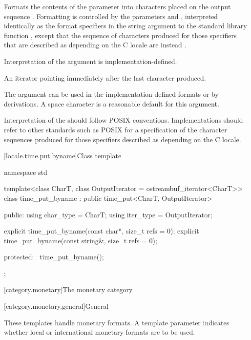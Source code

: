 \begin{itemdescr}
\pnum
\effects
Formats the contents of the parameter 
into characters placed on the output sequence .
Formatting is controlled by the parameters  and ,
interpreted identically as the format specifiers
in the string argument to the standard library function
%
,
except that the sequence of characters produced for those specifiers
that are described as depending on the C locale
are instead
.
\begin{note}
Interpretation of the  argument is implementation-defined.
\end{note}

\pnum
\returns
An iterator pointing immediately after the last character produced.
\begin{note}
The  argument can be used
in the implementation-defined formats or by derivations.
A space character is a reasonable default for this argument.
\end{note}

\pnum
\recommended
Interpretation of the  should follow POSIX conventions.
Implementations should refer to other standards such as POSIX
for a specification of the character sequences produced for
those specifiers described as depending on the C locale.
\end{itemdescr}

[locale.time.put.byname]{Class template }

%
\begin{codeblock}
namespace std {
  template<class CharT, class OutputIterator = ostreambuf_iterator<CharT>>
    class time_put_byname : public time_put<CharT, OutputIterator> {
    public:
      using char_type = CharT;
      using iter_type = OutputIterator;

      explicit time_put_byname(const char*, size_t refs = 0);
      explicit time_put_byname(const string&, size_t refs = 0);

    protected:
      ~time_put_byname();
    };
}
\end{codeblock}

[category.monetary]{The monetary category}

[category.monetary.general]{General}

\pnum
These templates handle monetary formats.
A template parameter indicates
whether local or international monetary formats are to be used.

